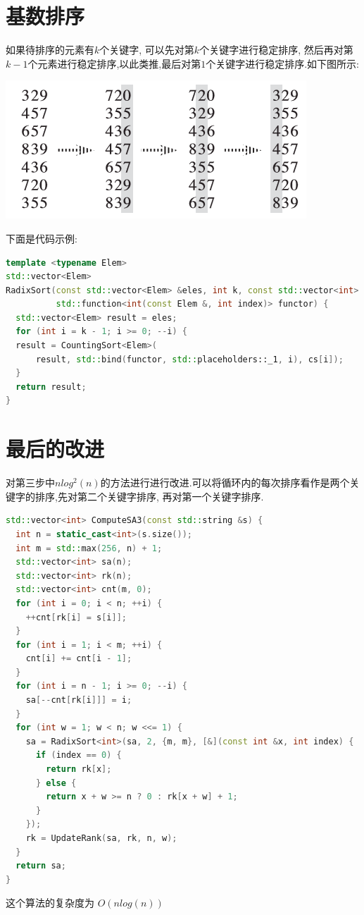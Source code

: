 \documentclass{article}
\begin{document}
\section{基数排序}
如果待排序的元素有$k$个关键字, 可以先对第$k$个关键字进行稳定排序, 然后再对第$k-1$个元素进行稳定排序,以此类推,最后对第$1$个关键字进行稳定排序.如下图所示: \par
\includegraphics[scale=0.6]{pic1.png} \par
下面是代码示例: \par
\begin{lstlisting}[language=C++, caption={Radix Sort}]
template <typename Elem>
std::vector<Elem>
RadixSort(const std::vector<Elem> &eles, int k, const std::vector<int> &cs,
          std::function<int(const Elem &, int index)> functor) {
  std::vector<Elem> result = eles;
  for (int i = k - 1; i >= 0; --i) {
  result = CountingSort<Elem>(
      result, std::bind(functor, std::placeholders::_1, i), cs[i]);
  }
  return result;
}

\end{lstlisting}

\section{最后的改进}
对第三步中$nlog^{2}(n)$的方法进行进行改进.可以将循环内的每次排序看作是两个关键字的排序,先对第二个关键字排序, 再对第一个关键字排序. \par
\begin{lstlisting}[language=C++, caption={Last Improvement}]
std::vector<int> ComputeSA3(const std::string &s) {
  int n = static_cast<int>(s.size());
  int m = std::max(256, n) + 1;
  std::vector<int> sa(n);
  std::vector<int> rk(n);
  std::vector<int> cnt(m, 0);
  for (int i = 0; i < n; ++i) {
    ++cnt[rk[i] = s[i]];
  }
  for (int i = 1; i < m; ++i) {
    cnt[i] += cnt[i - 1];
  }
  for (int i = n - 1; i >= 0; --i) {
    sa[--cnt[rk[i]]] = i;
  }
  for (int w = 1; w < n; w <<= 1) {
    sa = RadixSort<int>(sa, 2, {m, m}, [&](const int &x, int index) {
      if (index == 0) {
        return rk[x];
      } else {
        return x + w >= n ? 0 : rk[x + w] + 1;
      }
    });
    rk = UpdateRank(sa, rk, n, w);
  }
  return sa;
}
\end{lstlisting}
这个算法的复杂度为 $O(nlog(n))$
\end{document}
